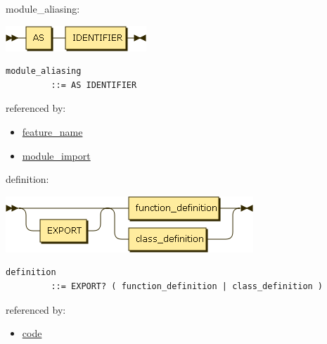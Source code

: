 \begin{minipage}{\textwidth}
\protect\hypertarget{module_aliasing}{}{module\_aliasing:}

\includegraphics[width=2.08333in,height=0.37500in]{diagram/module_aliasing.png}

\begin{verbatim}
module_aliasing
         ::= AS IDENTIFIER
\end{verbatim}

referenced by:

\begin{itemize}
\tightlist
\item
  \protect\hyperlink{feature_name}{feature\_name}
\item
  \protect\hyperlink{module_import}{module\_import}
\end{itemize}

\end{minipage}

\begin{minipage}{\textwidth}
\protect\hypertarget{definition}{}{definition:}

\includegraphics[width=3.66667in,height=0.83333in]{diagram/definition.png}

\begin{verbatim}
definition
         ::= EXPORT? ( function_definition | class_definition )
\end{verbatim}

referenced by:

\begin{itemize}
\tightlist
\item
  \protect\hyperlink{code}{code}
\end{itemize}

\end{minipage}

